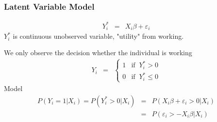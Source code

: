 \documentclass[pdftex]{beamer}
\begin{document}
%
%
%
%




 \begin{frame}
\frametitle{Latent Variable Model}

\begin{eqnarray*}
  Y_i^* &=& X_i \beta + \varepsilon_i
\end{eqnarray*}
$ Y_i^*$ is continuous unobserved variable, "utility" from working.

We only observe the decision whether the individual is working
 \begin{eqnarray*}
 Y_i&=& \left\{ \begin{array}{cc}
                                               1 & \text{if}\;\; Y_i^* > 0 \\
                                                0 & \text{if}\;\; Y_i^* \leq 0
                                                 \end{array} \right.
\end{eqnarray*}
Model
\begin{eqnarray*}
  P(Y_i=1|X_i) = P(Y_i^* > 0 | X_i) &=& P(X_i \beta + \varepsilon_i > 0 | X_i) \\
  &=& P( \varepsilon_i > - X_i \beta  | X_i)
\end{eqnarray*}

\end{frame}
\end{document}
